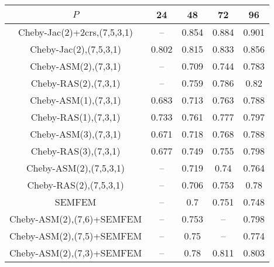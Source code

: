 \begin{table*}
\centering
\begin{tabular}{||c||cccc||}
	\hline
	$P$ & 24 & 48 & 72 & 96 \\
	\hline\hline
	Cheby-Jac(2)+2crs,(7,5,3,1)	&	 --	&	0.854	&	0.884	&	0.901\\
	Cheby-Jac(2),(7,5,3,1)	&	0.802	&	0.815	&	0.833	&	0.856\\
	Cheby-ASM(2),(7,3,1)	&	 --	&	0.709	&	0.744	&	0.783\\
	Cheby-RAS(2),(7,3,1)	&	 --	&	0.759	&	0.786	&	0.82\\
	Cheby-ASM(1),(7,3,1)	&	0.683	&	0.713	&	0.763	&	0.788\\
	Cheby-RAS(1),(7,3,1)	&	0.733	&	0.761	&	0.777	&	0.797\\
	Cheby-ASM(3),(7,3,1)	&	0.671	&	0.718	&	0.768	&	0.788\\
	Cheby-RAS(3),(7,3,1)	&	0.677	&	0.749	&	0.755	&	0.798\\
	Cheby-ASM(2),(7,5,3,1)	&	 --	&	0.719	&	0.74	&	0.764\\
	Cheby-RAS(2),(7,5,3,1)	&	 --	&	0.706	&	0.753	&	0.78\\
	SEMFEM	&	 --	&	0.7	&	0.751	&	0.748\\
	Cheby-ASM(2),(7,6)+SEMFEM	&	 --	&	0.753	&	 --	&	0.798\\
	Cheby-ASM(2),(7,5)+SEMFEM	&	 --	&	0.75	&	 --	&	0.774\\
	Cheby-ASM(2),(7,3)+SEMFEM	&	 --	&	0.78	&	0.811	&	0.803\\
\hline
\end{tabular}
\caption{\label{table:foobar}}
\end{table*}
